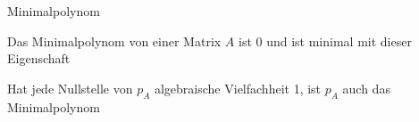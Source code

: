 \documentclass[class=article, crop=false]{standalone}
\begin{document}
\begin{zettel}{Minimalpolynom}

    Das Minimalpolynom von einer Matrix $A$ ist 0 und ist minimal mit dieser Eigenschaft

    Hat jede Nullstelle von $p_{A}$ algebraische Vielfachheit 1, ist $p_{A}$ auch das Minimalpolynom

\end{zettel}
\end{document}
